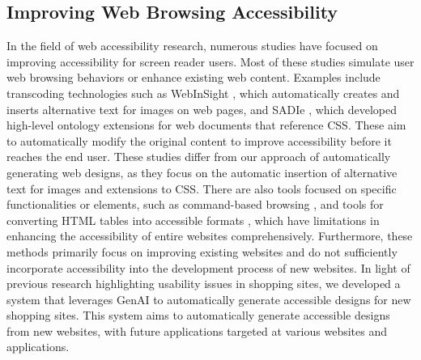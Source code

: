 \subsection{\textbf{Improving Web Browsing Accessibility}}
In the field of web accessibility research, numerous studies have focused on improving accessibility for screen reader users. Most of these studies simulate user web browsing behaviors or enhance existing web content. Examples include transcoding technologies such as WebInSight \cite{bigham2006webinsight}, which automatically creates and inserts alternative text for images on web pages, and SADIe \cite{harper2007sadie}, which developed high-level ontology extensions for web documents that reference CSS. These aim to automatically modify the original content to improve accessibility before it reaches the end user. These studies differ from our approach of automatically generating web designs, as they focus on the automatic insertion of alternative text for images and extensions to CSS. There are also tools focused on specific functionalities or elements, such as command-based browsing \cite{10.1145/3519032}, and tools for converting HTML tables into accessible formats \cite{10.1145/3491102.3517469}, which have limitations in enhancing the accessibility of entire websites comprehensively. Furthermore, these methods primarily focus on improving existing websites and do not sufficiently incorporate accessibility into the development process of new websites. In light of previous research highlighting usability issues in shopping sites, we developed a system that leverages GenAI to automatically generate accessible designs for new shopping sites. This system aims to automatically generate accessible designs from new websites, with future applications targeted at various websites and applications.

